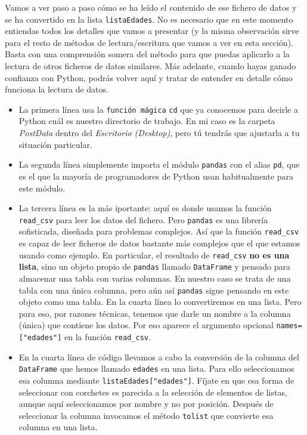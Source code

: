 \documentclass[10pt,a4paper]{article}\usepackage[]{graphicx}\usepackage[]{color}
\newcounter {cont01}
\begin{document}
Vamos a ver paso a paso cómo se  ha leído el contenido de ese fichero de datos y se ha convertido en la lista {\tt listaEdades}. No es necesario que en este momento entiendas todos los detalles que vamos a presentar (y la misma observación sirve para el resto de métodos de lectura/escritura que vamos a ver en esta sección). Basta con una comprensión somera del método para que puedas aplicarlo a la lectura de otros ficheros de datos similares. Más adelante, cuando hayas ganado confianza con Python, podrás volver aquí y tratar de entender en detalle cómo funciona la lectura de datos.
\begin{itemize}

\item La primera línea usa la {\tt función mágica} {\tt cd} que ya conocemos para decirle a Python cuál es nuestro directorio de trabajo. En mi caso es la carpeta {\em PostData} dentro del {\em Escritorio (Desktop)}, pero tú tendrás que ajustarla a tu situación particular.

\item La segunda línea simplemente importa el módulo {\tt pandas} con el alias {\tt pd}, que es el que la mayoría de programadores de Python usan habitualmente para este módulo.

\item La tercera línea es la más iportante: aquí es donde usamos la función \verb#read_csv# para leer los datos del fichero. Pero {\tt pandas} es una librería sofisticada, diseñada para problemas complejos. Así que la función \verb#read_csv# es capaz de leer ficheros de datos bastante más complejos que el que estamos usando como ejemplo. En particular, el resultado de \verb#read_csv# {\bf no es una lista}, sino un objeto propio de {\tt pandas} llamado {\tt DataFrame} y pensado para almacenar una tabla con varias columnas. En nuestro caso se trata de una tabla con una única columna, pero aún así {\tt pandas} sigue pensando en este objeto como una tabla. En la cuarta línea lo convertiremos en una lista. Pero para eso, por razones técnicas, tenemos que darle un nombre a la  columna (única) que contiene los datos. Por eso aparece el argumento opcional \verb#names=["edades"]# en la función \verb#read_csv#.

\item En la cuarta línea de código llevamos a cabo la conversión de la columna del {\tt DataFrame} que hemos llamado {\tt edades} en una lista. Para ello seleccionamos esa columna mediante \verb#listaEdades["edades"]#. Fíjate en que esa forma de seleccionar con corchetes es parecida a la selección de elementos de listas, aunque aquí seleccionamos por nombre y no por posición. Después de seleccionar la columna invocamos el método {\tt tolist} que convierte esa columna en una lista.
\end{itemize}
\end{document}
